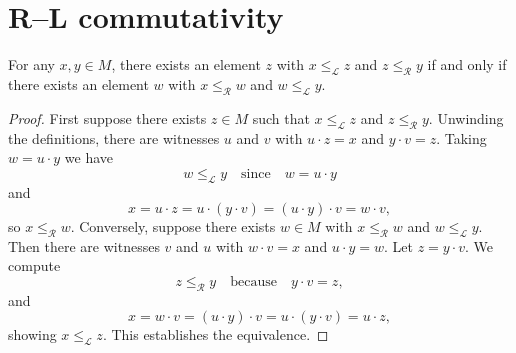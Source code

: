 \section{R--L commutativity}

\begin{lemma}
\label{lem:rLE_lLE_comm}
For any \(x,y \in M\), there exists an element \(z\) with \(x \le_{\mathcal L} z\) and \(z \le_{\mathcal R} y\) if and only if there exists an element \(w\) with \(x \le_{\mathcal R} w\) and \(w \le_{\mathcal L} y\).
\leanok
{}
\end{lemma}
\begin{proof}
\leanok
First suppose there exists \(z\in M\) such that \(x \le_{\mathcal L} z\) and \(z \le_{\mathcal R} y\).  Unwinding the definitions, there are witnesses \(u\) and \(v\) with \(u\cdot z = x\) and \(y\cdot v = z\).  Taking \(w = u\cdot y\) we have
\[
  w \le_{\mathcal L} y \quad\text{since}\quad w = u\cdot y
\]
and
\[
  x = u\cdot z = u\cdot (y\cdot v) = (u\cdot y)\cdot v = w\cdot v,
\]
so \(x \le_{\mathcal R} w\).  Conversely, suppose there exists \(w\in M\) with \(x \le_{\mathcal R} w\) and \(w \le_{\mathcal L} y\).  Then there are witnesses \(v\) and \(u\) with \(w\cdot v = x\) and \(u\cdot y = w\).  Let \(z = y\cdot v\).  We compute
\[
  z \le_{\mathcal R} y \quad\text{because}\quad y\cdot v = z,
\]
and
\[
  x = w\cdot v = (u\cdot y)\cdot v = u\cdot (y\cdot v) = u\cdot z,
\]
showing \(x \le_{\mathcal L} z\).  This establishes the equivalence.
\end{proof}

